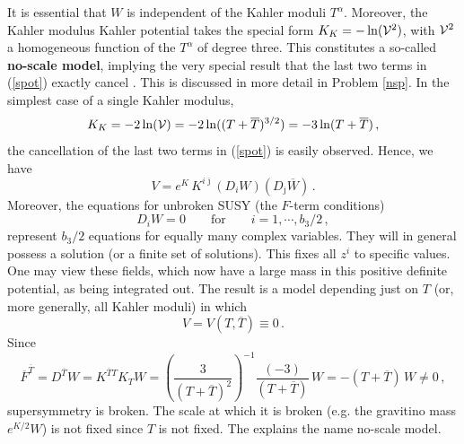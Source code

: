 \documentclass[12pt]{article}
\newcommand{\be}{\begin{equation}}
\newcommand{\ee}{\end{equation}}
\newcommand{\ol}{\overline}
\numberwithin{equation}{section}
\begin{document}
It is essential that $W$ is independent of the Kahler moduli $T^\alpha$. Moreover, the Kahler modulus Kahler potential takes the special form $K_K=-\ln({\cal V}^2)$, with ${\cal V}^2$ a homogeneous function of the $T^\alpha$ of degree three. This constitutes a so-called {\bf no-scale model}, implying the very special result that the last two terms in (\ref{spot}) exactly cancel \cite{Cremmer:1983bf}. This is discussed in more detail in Problem \ref{nsp}. In the simplest case of a single Kahler modulus,
\be
K_K=-2\ln({\cal V})=-2\ln((T+\ol{T})^{3/2})=-3\ln(T+\ol{T})\,,
\ee
the cancellation of the last two terms in (\ref{spot}) is easily observed. Hence, we have
\be
V=e^{K}\, K^{i\ol{\jmath}}(D_i W)(D_{\ol{\jmath}}\ol{W})\,.
\ee
Moreover, the equations for unbroken SUSY (the $F$-term conditions) 
\be
D_i W=0\qquad\mbox{for}\qquad i=1,\cdots,b_3/2\,,
\ee
represent $b_3/2$ equations for equally many complex variables. They will in general possess a solution (or a finite set of solutions). This fixes all $z^i$ to specific values. One may view these fields, which now have a large mass in this positive definite potential, as being integrated out. The result is a model depending just on $T$ (or, more generally, all Kahler moduli) in which 
\be
V=V(T,\ol{T})\equiv 0\,.
\ee
Since
\be
\ol{F}^{\ol{T}}=D^{\ol{T}} W=K^{\ol{T}T}K_T W=\left(\frac{3}{(T+\ol{T})^2}\right)^{-1}\frac{(-3)}{(T+\ol{T})}\,W
=-(T+\ol{T})\,W\neq 0\,,
\ee
supersymmetry is broken. The scale at which it is broken (e.g. the gravitino mass $e^{K/2}W$) is not fixed since $T$ is not fixed. The explains the name no-scale model. 
\end{document}
